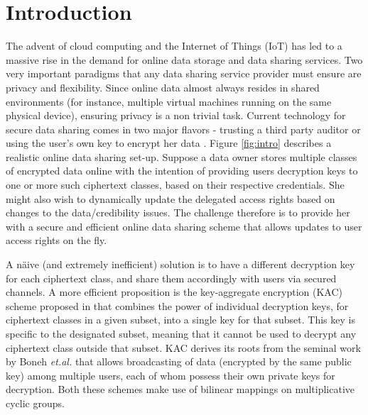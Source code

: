 \section{Introduction}
\label{sec:Intro}

The advent of cloud computing and the Internet of Things (IoT) has led to a massive rise in the demand for online data storage and data sharing services. Two very important paradigms that any data sharing service provider must ensure are privacy and flexibility. Since online data almost always resides in shared environments (for instance, multiple virtual machines running on the same physical device), ensuring privacy is a non trivial task. Current technology for secure data sharing comes in two major flavors - trusting a third party auditor \cite{cryptoeprint:2009:579} or using the user's own key to encrypt her data \cite{chow2012dynamic}. Figure \ref{fig:intro} describes a realistic online data sharing set-up. Suppose a data owner stores multiple classes of encrypted data online with the intention of providing users decryption keys to one or more such ciphertext classes, based on their respective credentials. She might also wish to dynamically update the delegated access rights based on 
changes to the data/credibility issues. The challenge therefore is to provide her with a secure and efficient online data sharing scheme that allows updates to user access rights on the fly. 


A n\"{a}ive (and extremely inefficient) solution is to have a different decryption key for each ciphertext class, and share them accordingly with users via secured channels. A more efficient proposition is the key-aggregate encryption (KAC) scheme proposed in \cite{chu2014key} that combines the power of individual decryption keys, for ciphertext classes in a given subset, into a single key for that subset. This key is specific to the designated subset, meaning that it cannot be used to decrypt any ciphertext class outside that subset. KAC derives its roots from the seminal work by Boneh \textit{et.al.} \cite{boneh2005collusion} that allows broadcasting of data (encrypted by the same public key) among multiple users, each of whom possess their own private keys for decryption. Both these schemes make use of bilinear mappings on multiplicative cyclic groups. 

